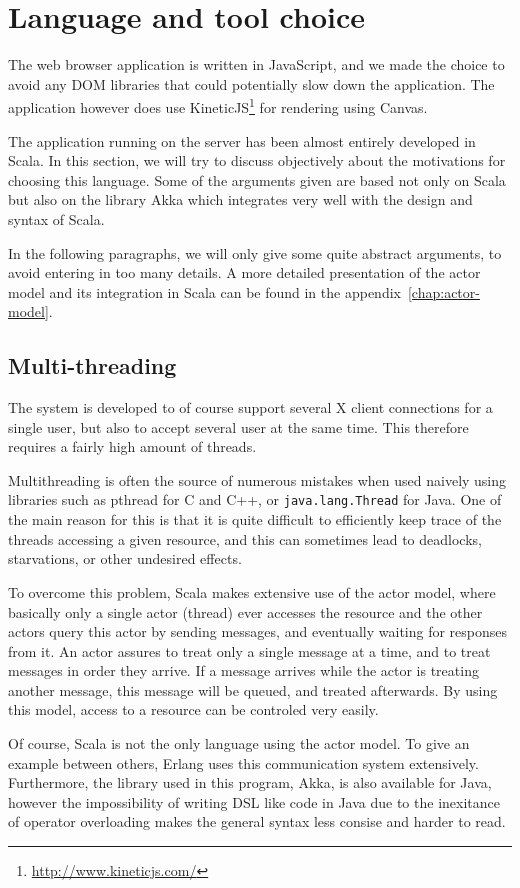 \section{Language and tool choice}
%
The web browser application is written in JavaScript, and we made the 
choice to avoid any DOM libraries that could potentially slow down the application.
The application however does use KineticJS\footnote{\url{http://www.kineticjs.com/}}
for rendering using Canvas.
%

The application running on the server has been almost entirely developed in Scala. 
In this section, we will try to discuss objectively about 
the motivations for choosing this language. Some of the arguments given 
are based not only on Scala but also on the library Akka which integrates 
very well with the design and syntax of Scala.

In the following paragraphs, we will only give some quite abstract arguments, 
to avoid entering in too many details. A more detailed presentation 
of the actor model and its integration in Scala can be found 
in the appendix~\ref{chap:actor-model}.
%
\subsection{Multi-threading}
The system is developed to of course support several X client connections 
for a single user, but also to accept several user at the same time.
This therefore requires a fairly high amount of threads.

Multithreading is often the source of numerous mistakes when used naively 
using libraries such as pthread for C and C++, or \lstinline{java.lang.Thread} 
for Java. One of the main reason for this is that it is quite difficult to 
efficiently keep trace of the threads accessing a given resource, 
and this can sometimes lead to deadlocks, starvations, or other undesired 
effects.

To overcome this problem, Scala makes extensive use of the actor model, where 
basically only a single actor (thread) ever accesses the resource and 
the other actors query this actor by sending messages, and eventually waiting 
for responses from it. An actor assures to treat only a single message 
at a time, and to treat messages in order they arrive. If a message 
arrives while the actor is treating another message, this message will 
be queued, and treated afterwards. By using this model, access to a 
resource can be controled very easily.

Of course, Scala is not the only language using the actor model. To 
give an example between others, Erlang uses this communication system 
extensively. Furthermore, the library used in this program, Akka, is
also available for Java, however the impossibility of writing DSL like 
code in Java due to the inexitance of operator overloading makes the 
general syntax less consise and harder to read.
%
